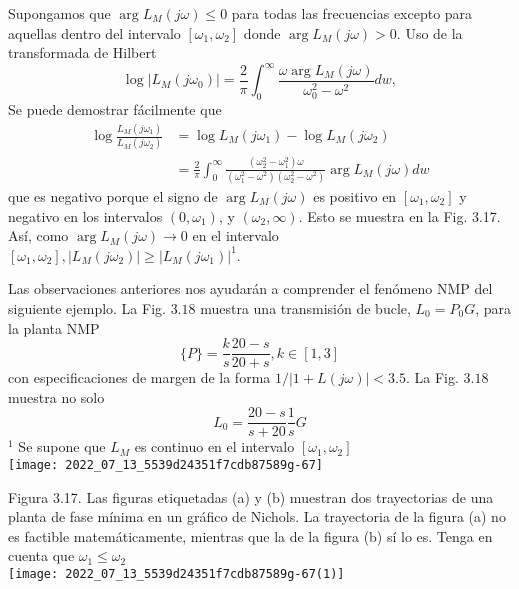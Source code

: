 Supongamos que $\arg L_{M}(j \omega) \leq 0$ para todas las frecuencias excepto para aquellas dentro del intervalo $\left[\omega_{1}, \omega_{2}\right]$ donde $\arg L_{M}(j \omega)>0$. Uso de la transformada de Hilbert
$$
\log \left| L_{M}\left(j \omega_{0}\right)\right|=\frac{2}{\pi} \int_{0}^{\infty} \frac{\omega \arg L_{M}(j \omega)}{\omega_{0}^{2}-\omega^{2}} d w,
$$
Se puede demostrar fácilmente que
$$
\begin{aligned}
\log \frac{L_{M}\left(j \omega_{1}\right)}{L_{M}\left(j \omega_{2}\right)} &=\log L_{M}\left(j \omega_{1}\right)-\log L_{M}\left(j \omega_{2}\right) \\
&=\frac{2}{\pi} \int_{0}^{\infty} \frac{\left(\omega_{2}^{2}-\omega_{1}^{2}\right) \omega}{\left(\omega_{1}^{2}-\omega^{2}\right)\left(\omega_{2}^{2}-\omega^{2}\right)} \arg L_{M}(j \omega) d w
\end{aligned}
$$
que es negativo porque el signo de $\arg L_{M}(j \omega)$ es positivo en $\left[\omega_{1}, \omega_{2}\right]$ y negativo en los intervalos $\left(0, \omega_{1}\right)$, y $\left(\omega_{2}, \infty\right)$. Esto se muestra en la Fig. 3.17. Así, como $\arg L_{M}(j \omega) \rightarrow 0$ en el intervalo $\left[\omega_{1}, \omega_{2}\right],\left| L_{M}\left(j \omega_{2}\right)\right| \geq\left| L_{M}\left(j \omega_{1}\right)\right|^{1}$.

Las observaciones anteriores nos ayudarán a comprender el fenómeno NMP del siguiente ejemplo. La Fig. $3.18$ muestra una transmisión de bucle, $L_{0}=P_{0} G$, para la planta NMP
$$
\{P\}=\frac{k}{s} \frac{20-s}{20+s}, k \in[1,3]
$$
con especificaciones de margen de la forma $1 /|1+L(j \omega)|<3.5$. La Fig. $3.18$ muestra no solo
$$
L_{0}=\frac{20-s}{s+20} \frac{1}{s} G
$$
${ }^{1}$ Se supone que $L_{M}$ es continuo en el intervalo $\left[\omega_{1}, \omega_{2}\right]$\\

\texttt{[image: 2022\_07\_13\_5539d24351f7cdb87589g-67]}

Figura 3.17. Las figuras etiquetadas (a) y (b) muestran dos trayectorias de una planta de fase mínima en un gráfico de Nichols. La trayectoria de la figura (a) no es factible matemáticamente, mientras que la de la figura (b) sí lo es. Tenga en cuenta que $\omega_{1} \leq \omega_{2}$\\

\texttt{[image: 2022\_07\_13\_5539d24351f7cdb87589g-67(1)]}

